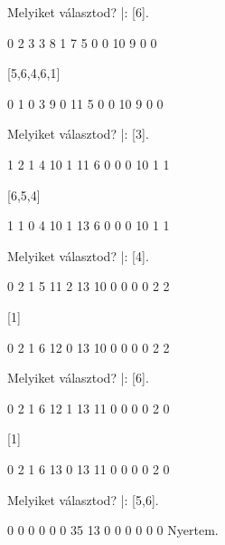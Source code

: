 \begin{query}
Melyiket választod?
|: [6].

     0    2    3    3    8    1
7                                  5
     0    0    10   9    0    0

[5,6,4,6,1]

     0    1    0    3    9    0
11                                 5
     0    0    10   9    0    0

Melyiket választod?
|: [3].

     1    2    1    4    10   1
11                                 6
     0    0    0    10   1    1

[6,5,4]

     1    1    0    4    10   1
13                                 6
     0    0    0    10   1    1

Melyiket választod?
|: [4].

     0    2    1    5    11   2
13                                 10
     0    0    0    0    2    2

[1]

     0    2    1    6    12   0
13                                 10
     0    0    0    0    2    2

Melyiket választod?
|: [6].

     0    2    1    6    12   1
13                                 11
     0    0    0    0    2    0

[1]

     0    2    1    6    13   0
13                                 11
     0    0    0    0    2    0

Melyiket választod?
|: [5,6].

     0    0    0    0    0    0
35                                 13
     0    0    0    0    0    0
Nyertem.
\end{query}

